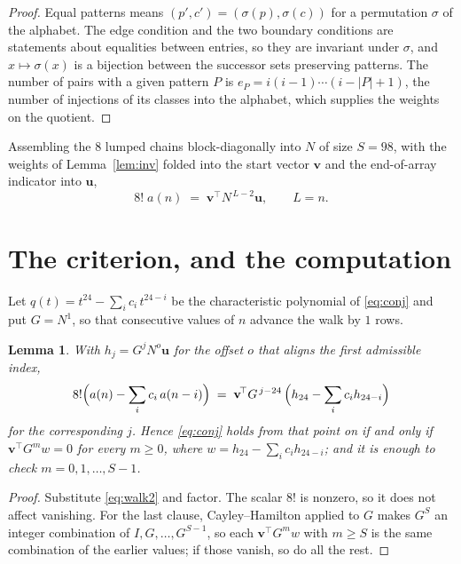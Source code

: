 \documentclass[11pt,a4paper]{article}
\theoremstyle{plain}
\newtheorem{lemma}[theorem]{Lemma}
\theoremstyle{definition}
\begin{document}
\begin{proof}
Equal patterns means $(p',c')=(\sigma(p),\sigma(c))$ for a permutation $\sigma$ of the
alphabet. The edge condition and the two boundary conditions are statements about equalities
between entries, so they are invariant under $\sigma$, and $x\mapsto\sigma(x)$ is a bijection
between the successor sets preserving patterns. The number of pairs with a given pattern $P$
is $e_P=i(i-1)\cdots(i-|P|+1)$, the number of injections of its classes into the alphabet,
which supplies the weights on the quotient.
\end{proof}

Assembling the $8$ lumped chains block-diagonally into $N$ of size $S=98$, with the
weights of Lemma~\ref{lem:inv} folded into the start vector $\mathbf{v}$ and the
end-of-array indicator into $\mathbf{u}$,
\begin{equation}\label{eq:walk2}
8!\;a(n)\;=\;\mathbf{v}^{\!\top}N^{\,L-2}\mathbf{u},\qquad L=n .
\end{equation}

\section{The criterion, and the computation}

Let $q(t)=t^{24}-\sum_i c_i\,t^{24-i}$ be the characteristic polynomial of
\eqref{eq:conj} and put $G=N^{1}$, so that consecutive values of $n$ advance the
walk by $1$ rows.

\begin{lemma}\label{lem:crit}
With $h_j=G^{j}N^{o}\mathbf{u}$ for the offset $o$ that aligns the first admissible
index,
\[
8!\Bigl(a(n)-\sum_i c_i\,a(n-i)\Bigr)\;=\;\mathbf{v}^{\!\top}G^{\,j-24}\,
\Bigl(h_{24}-\sum_i c_i h_{24-i}\Bigr)
\]
for the corresponding $j$. Hence \eqref{eq:conj} holds from that point on if and only if
$\mathbf{v}^{\!\top}G^{m}w=0$ for every $m\ge0$, where
$w=h_{24}-\sum_i c_ih_{24-i}$; and it is enough to check $m=0,1,\dots,S-1$.
\end{lemma}

\begin{proof}
Substitute \eqref{eq:walk2} and factor. The scalar $8!$ is nonzero, so it does not
affect vanishing. For the last clause, Cayley--Hamilton applied to $G$ makes $G^{S}$ an
integer combination of $I,G,\dots,G^{S-1}$, so each $\mathbf{v}^{\!\top}G^{m}w$ with
$m\ge S$ is the same combination of the earlier values; if those vanish, so do all the rest.
\end{proof}
\end{document}
